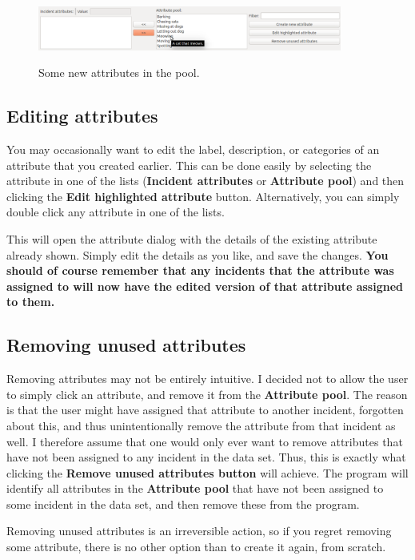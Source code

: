 \documentclass{memoir}
\begin{document}
\begin{figure}[h!]
  \centering
  \caption{Some new attributes in the pool.}
  \includegraphics[width=100mm]{Screenshot_9.pdf}
  \label{fig:attributepool}
\end{figure}


\subsection{Editing attributes}
\label{sec:editingattributes}

You may occasionally want to edit the label, description, or categories of an attribute that you created earlier. This can be done easily by selecting the attribute in one of the lists (\textbf{Incident attributes} or \textbf{Attribute pool}) and then clicking the \textbf{Edit highlighted attribute} button. Alternatively, you can simply double click any attribute in one of the lists.

This will open the attribute dialog with the details of the existing attribute already shown. Simply edit the details as you like, and save the changes. \textbf{You should of course remember that any incidents that the attribute was assigned to will now have the edited version of that attribute assigned to them.}

\subsection{Removing unused attributes}
\label{sec:removingattributes}

Removing attributes may not be entirely intuitive. I decided not to allow the user to simply click an attribute, and remove it from the \textbf{Attribute pool}. The reason is that the user might have assigned that attribute to another incident, forgotten about this, and thus unintentionally remove the attribute from that incident as well. I therefore assume that one would only ever want to remove attributes that have not been assigned to any incident in the data set. Thus, this is exactly what clicking the \textbf{Remove unused attributes button} will achieve. The program will identify all attributes in the \textbf{Attribute pool} that have not been assigned to some incident in the data set, and then remove these from the program.

Removing unused attributes is an irreversible action, so if you regret removing some attribute, there is no other option than to create it again, from scratch.
\end{document}
